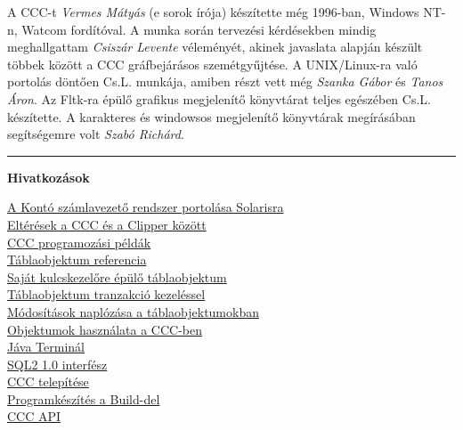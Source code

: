 A CCC-t {\em Vermes Mátyás} (e sorok írója) 
készítette még 1996-ban, Windows NT-n, Watcom fordítóval.
A munka során tervezési kérdésekben mindig meghallgattam
{\em Csiszár Levente\/} véleményét, akinek javaslata alapján készült
többek között a CCC gráfbejárásos szemétgyűjtése. 
A UNIX/Linux-ra való portolás döntően Cs.L. munkája, 
amiben részt vett még {\em Szanka Gábor\/} és {\em Tanos Áron}. 
Az Fltk-ra épülő grafikus megjelenítő könyvtárat teljes egészében Cs.L. 
készítette. A karakteres és windowsos megjelenítő könyvtárak 
megírásában segítségemre volt {\em Szabó Richárd}.

\bigskip
\hrule\nopagebreak 
{\bf Hivatkozások}\par\nopagebreak
\href{solarisport.html}{A Kontó számlavezető rendszer portolása Solarisra}\\
\href{ccc-clipper-elteresek.html}{Eltérések a CCC és a Clipper  között}\\
\href{cccapix.html}{CCC programozási példák}\\
\href{tabobj.html}{Táblaobjektum referencia}\\
\href{btbtx.html}{Saját kulcskezelőre épülő táblaobjektum}\\
\href{transact.html}{Táb\-la\-ob\-jek\-tum tranzakció kezeléssel} \\
\href{tabnaplo.html}{Mó\-do\-sítá\-sok naplózása a táblaobjektumokban}\\
\href{objektum.html}{Objektumok használata a CCC-ben}\\
\href{jterminal.html}{Jáva Terminál}\\
\href{sql2.html}{SQL2 1.0 interfész}\\
\href{install.html}{CCC telepítése}\\
\href{build.html}{Programkészítés a Build-del}\\
\href{cccapi.html}{CCC API}\\
 
 